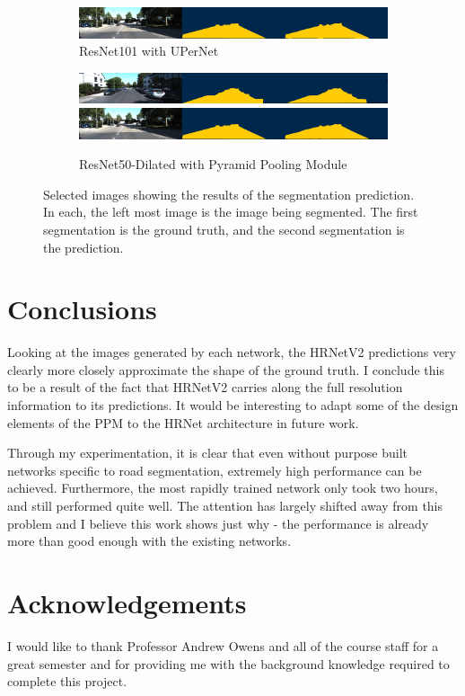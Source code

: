 \documentclass[10pt,twocolumn,letterpaper]{article}
\begin{document}
\begin{figure}
\begin{subfigure}[t]{\linewidth}
        \includegraphics[width=0.9\linewidth]{images/rn50_b.png}
        \caption{ResNet101 with UPerNet}
    \end{subfigure}
    \begin{subfigure}[t]{\linewidth}
        \centering
        \includegraphics[width=0.9\linewidth]{images/rn100_a.png}
        \includegraphics[width=0.9\linewidth]{images/rn100_b.png}
        \caption{ResNet50-Dilated with Pyramid Pooling Module}
    \end{subfigure}
    \caption{Selected images showing the results of the segmentation prediction. In each, the left most image is the image being segmented. The first segmentation is the ground truth, and the second segmentation is the prediction.}
    \label{fig:samples}
\end{figure}

\section{Conclusions}
Looking at the images generated by each network, the HRNetV2 predictions very clearly more closely approximate the shape of the ground truth. I conclude this to be a result of the fact that HRNetV2 carries along the full resolution information to its predictions. It would be interesting to adapt some of the design elements of the PPM to the HRNet architecture in future work.

Through my experimentation, it is clear that even without purpose built networks specific to road segmentation, extremely high performance can be achieved. Furthermore, the most rapidly trained network only took two hours, and still performed quite well. The attention has largely shifted away from this problem and I believe this work shows just why - the performance is already more than good enough with the existing networks.

\section{Acknowledgements} I would like to thank Professor Andrew Owens and all of the course staff for a great semester and for providing me with the background knowledge required to complete this project.

{\small


}
\end{document}
